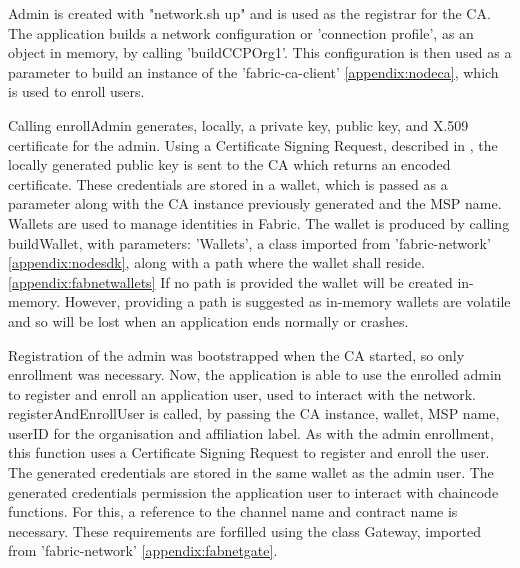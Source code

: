 Admin is created with "network.sh up" and is used as the registrar for the CA. 
The application builds a network configuration or 'connection profile', as an object in memory, by calling 'buildCCPOrg1'.
This configuration is then used as a parameter to build an instance of the 'fabric-ca-client' \ref{appendix:nodeca},
which is used to enroll users.

Calling enrollAdmin generates, locally, a private key, public key, and X.509 certificate for the admin.
Using a Certificate Signing Request, described in \cite{noauthor_rfc2986_nodate}, the locally generated public key is sent to the CA which returns an encoded certificate. %
These credentials are stored in a wallet, which is passed as a parameter along with the CA instance previously generated and the MSP name.  Wallets are used to manage identities in Fabric. \cite{noauthor_wallet_nodate}
The wallet is produced by calling buildWallet, with parameters: 'Wallets', a class imported from 'fabric-network' \ref{appendix:nodesdk}, along with a path where the wallet shall reside. \ref{appendix:fabnetwallets}
If no path is provided the wallet will be created in-memory. However, providing a path is suggested as in-memory wallets are volatile and so will be lost when an application ends normally or crashes. \cite{noauthor_wallet_nodate}

Registration of the admin was bootstrapped when the CA started, so only enrollment was necessary.
Now, the application is able to use the enrolled admin to register and enroll an application user, used to interact with the network.
registerAndEnrollUser is called, by passing the CA instance, wallet, MSP name, userID for the organisation and affiliation label. 
As with the admin enrollment, this function uses a Certificate Signing Request to register and enroll the user. The generated credentials are stored in the same wallet as the admin user. 
The generated credentials permission the application user to interact with chaincode functions.
For this, a reference to the channel name and contract name is necessary.
These requirements are forfilled using the class Gateway, imported from 'fabric-network' \ref{appendix:fabnetgate}.

